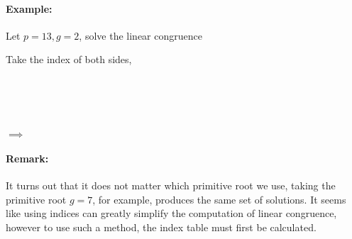 \documentclass[../main.tex]{subfiles}
\begin{document}
\paragraph{Example:} Let $p=13,g=2$, solve the linear congruence 
\begin{ans}
    Take the index of both sides,
    \begin{center}
         \\
         \\
         \\
         \\
        $\implies$ 
    \end{center}
\end{ans}
\paragraph{Remark:} It turns out that it does not matter which primitive root we use, taking the primitive root $g=7$, for example, produces the same set of solutions. It seems like using indices can greatly simplify the computation of linear congruence, however to use such a method, the index table must first be calculated.
\end{document}
